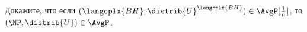 Докажите, что если $(\langcplx{BH}, \distrib{U}^{\langcplx{BH}}) \in \AvgP[\frac{1}{n}]$, то
$(\NP, \distrib{U}) \in \AvgP$.
